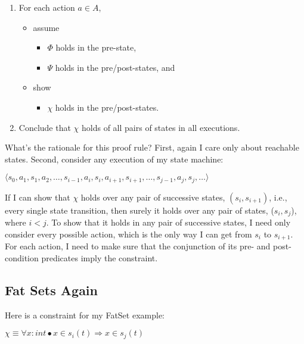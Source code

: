 \begin{enumerate}
\item For each action $a \in A$,
\begin{itemize}
\item assume
\begin{itemize}
\item $\Phi$ holds in the pre-state,
\item $\Psi$ holds in the pre/post-states, and
\end{itemize}

\item
show
\begin{itemize}
\item $\chi$ holds in the pre/post-states.
\end{itemize}
\end{itemize}

\item Conclude that $\chi$ holds of all pairs of states in all executions.
\end{enumerate}

What's the rationale for this proof rule?  First, again I care only
about reachable states.
Second, consider any execution of my state machine:

\begin{center}

$\langle s_0, a_1, s_1, a_2, \dots, s_{i-1}, a_i, s_i, a_{i+1}, s_{i+1}, \dots, s_{j-1}, a_j, s_j, \ldots \rangle$ 

\end{center}

\noindent
If I can show that $\chi$ holds over any pair of successive states,
$(s_i, s_{i+1})$,
i.e., every single state transition, then surely it holds over any
pair of states, ($s_i, s_j$), where $i < j$.
To show that it holds in any pair of successive states, I need
only consider every possible action, which is the only way I can
get from $s_i$ to $s_{i+1}$.  For each action, I need to make
sure that the conjunction of its pre- and post-condition predicates
imply the constraint.

\subsection{Fat Sets Again}

Here is a constraint for my FatSet example:

\begin{center}
$\chi \equiv \forall x: int \bullet x \in s_i(t) \Rightarrow x \in s_j(t)$
\end{center}

